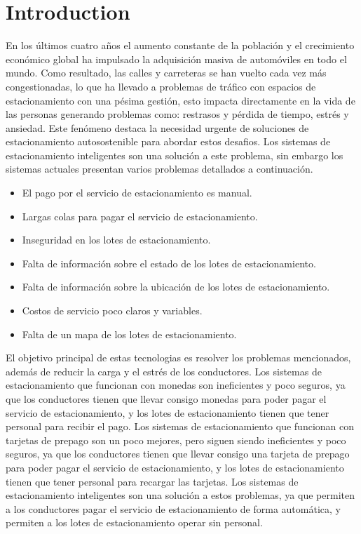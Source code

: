 \documentclass{article}
\begin{document}
\section*{Introduction}
En los últimos cuatro años el aumento constante de la población y el crecimiento económico global ha impulsado
la adquisición masiva de automóviles en todo el mundo. Como resultado, las calles y
carreteras se han vuelto cada vez más congestionadas, lo que ha llevado a problemas
de tráfico con espacios de estacionamiento con una pésima gestión, esto impacta
directamente en la vida de las personas generando problemas como: restrasos y pérdida
de tiempo,  estrés y ansiedad. Este fenómeno destaca la necesidad
urgente de soluciones de estacionamiento autosostenible para abordar estos desafios.
Los sistemas de estacionamiento inteligentes son una solución a este problema, sin 
embargo los sistemas actuales presentan varios problemas detallados a continuación.
\begin{itemize}
\item El pago por el servicio de estacionamiento es manual.
\item Largas colas para pagar el servicio de estacionamiento.
\item Inseguridad en los lotes de estacionamiento.
\item Falta de información sobre el estado de los lotes de estacionamiento.
\item Falta de información sobre la ubicación de los lotes de estacionamiento.
\item Costos de servicio poco claros y variables.
\item Falta de un mapa de los lotes de estacionamiento.
\end{itemize}
El objetivo principal de estas tecnologias es resolver los problemas mencionados,
adem\'as de reducir la carga y el estr\'es de los conductores.
Los sistemas de estacionamiento que funcionan con monedas son ineficientes y
poco seguros, ya que los conductores tienen que llevar consigo monedas para
poder pagar el servicio de estacionamiento, y los lotes de estacionamiento
tienen que tener personal para recibir el pago. Los sistemas de estacionamiento
que funcionan con tarjetas de prepago son un poco mejores, pero siguen siendo
ineficientes y poco seguros, ya que los conductores tienen que llevar consigo
una tarjeta de prepago para poder pagar el servicio de estacionamiento, y los
lotes de estacionamiento tienen que tener personal para recargar las tarjetas.
Los sistemas de estacionamiento inteligentes son una solución a estos problemas,
ya que permiten a los conductores pagar el servicio de estacionamiento de forma
automática, y permiten a los lotes de estacionamiento operar sin personal.
\end{document}
